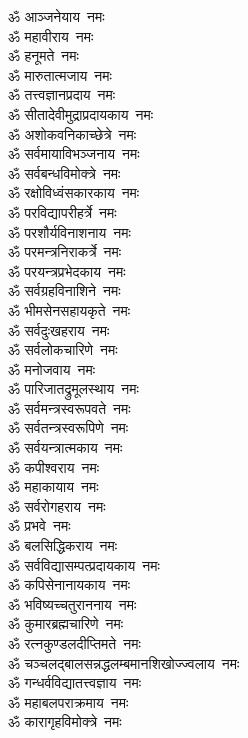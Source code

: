 \begin{multicols}{2}
\begin{flushleft}
ॐ आञ्जनेयाय~नमः\\
ॐ महावीराय~नमः\\
ॐ हनूमते~नमः\\
ॐ मारुतात्मजाय~नमः\\
ॐ तत्त्वज्ञानप्रदाय~नमः\\
ॐ सीतादेवीमुद्राप्रदायकाय~नमः\\
ॐ अशोकवनिकाच्छेत्रे~नमः\\
ॐ सर्वमायाविभञ्जनाय~नमः\\
ॐ सर्वबन्धविमोक्त्रे~नमः\\
ॐ रक्षोविध्वंसकारकाय~नमः\hfill{}\\
ॐ परविद्यापरीहर्त्रे~नमः\\
ॐ परशौर्यविनाशनाय~नमः\\
ॐ परमन्त्रनिराकर्त्रे~नमः\\
ॐ परयन्त्रप्रभेदकाय~नमः\\
ॐ सर्वग्रहविनाशिने~नमः\\
ॐ भीमसेनसहायकृते~नमः\\
ॐ सर्वदुःखहराय~नमः\\
ॐ सर्वलोकचारिणे~नमः\\
ॐ मनोजवाय~नमः\\
ॐ पारिजातद्रुमूलस्थाय~नमः\hfill{}\\
ॐ सर्वमन्त्रस्वरूपवते~नमः\\
ॐ सर्वतन्त्रस्वरूपिणे~नमः\\
ॐ सर्वयन्त्रात्मकाय~नमः\\
ॐ कपीश्वराय~नमः\\
ॐ महाकायाय~नमः\\
ॐ सर्वरोगहराय~नमः\\
ॐ प्रभवे~नमः\\
ॐ बलसिद्धिकराय~नमः\\
ॐ सर्वविद्यासम्पत्प्रदायकाय~नमः\\
ॐ कपिसेनानायकाय~नमः\hfill{}\\
ॐ भविष्यच्चतुराननाय~नमः\\
ॐ कुमारब्रह्मचारिणे~नमः\\
ॐ रत्नकुण्डलदीप्तिमते~नमः\\
ॐ चञ्चलद्बालसन्नद्ध\-लम्बमानशिखोज्ज्वलाय~नमः\\
ॐ गन्धर्वविद्यातत्त्वज्ञाय~नमः\\
ॐ महाबलपराक्रमाय~नमः\\
ॐ कारागृहविमोक्त्रे~नमः\\

\end{flushleft}
\end{multicols}
